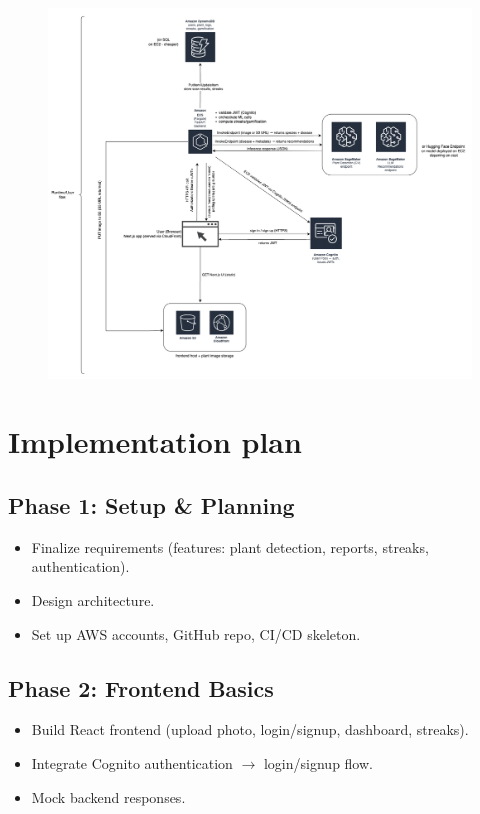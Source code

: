 \documentclass[11pt]{article}
\begin{document}
\begin{itemize}
\begin{figure}[H]
    \includegraphics[width=1\linewidth]{user_flow.png}
    \label{fig:System Design}
\end{figure}
\end{itemize}

\section{Implementation plan}
\subsection*{Phase 1: Setup \& Planning}
\begin{itemize}
    \item Finalize requirements (features: plant detection, reports, streaks, authentication).
    \item Design architecture.
    \item Set up AWS accounts, GitHub repo, CI/CD skeleton.
\end{itemize}

\subsection*{Phase 2: Frontend Basics}
\begin{itemize}
    \item Build React frontend (upload photo, login/signup, dashboard, streaks).
    \item Integrate Cognito authentication $\rightarrow$ login/signup flow.
    \item Mock backend responses.
\end{itemize}
\end{document}
